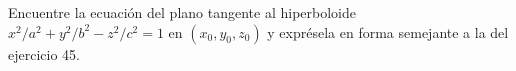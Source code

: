 \item Encuentre la ecuación del plano tangente al hiperboloide $x^2/a^2 + y^2/b^2 - z^2/c^2 = 1$ en $(x_0, y_0, z_0)$ y exprésela en forma semejante a la del ejercicio 45.
